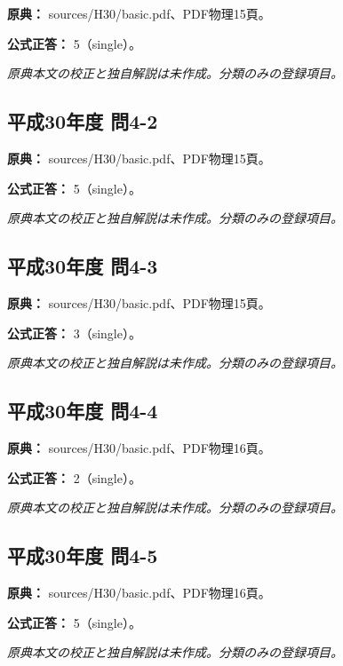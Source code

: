 \noindent\textbf{原典：} sources/H30/basic.pdf、PDF物理15頁。

\textbf{公式正答：} 5（single）。

\par\textit{原典本文の校正と独自解説は未作成。分類のみの登録項目。}

\subsection{平成30年度 問4-2}
\label{q:h30-reg-basic-4-2}

\noindent\textbf{原典：} sources/H30/basic.pdf、PDF物理15頁。

\textbf{公式正答：} 5（single）。

\par\textit{原典本文の校正と独自解説は未作成。分類のみの登録項目。}

\subsection{平成30年度 問4-3}
\label{q:h30-reg-basic-4-3}

\noindent\textbf{原典：} sources/H30/basic.pdf、PDF物理15頁。

\textbf{公式正答：} 3（single）。

\par\textit{原典本文の校正と独自解説は未作成。分類のみの登録項目。}

\subsection{平成30年度 問4-4}
\label{q:h30-reg-basic-4-4}

\noindent\textbf{原典：} sources/H30/basic.pdf、PDF物理16頁。

\textbf{公式正答：} 2（single）。

\par\textit{原典本文の校正と独自解説は未作成。分類のみの登録項目。}

\subsection{平成30年度 問4-5}
\label{q:h30-reg-basic-4-5}

\noindent\textbf{原典：} sources/H30/basic.pdf、PDF物理16頁。

\textbf{公式正答：} 5（single）。

\par\textit{原典本文の校正と独自解説は未作成。分類のみの登録項目。}

